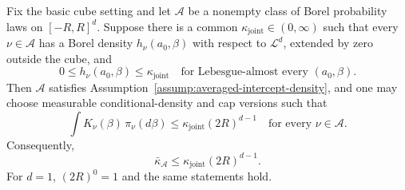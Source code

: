 \begin{lemma}
\label{lem:joint-density-bridge}
Fix the basic cube setting and let $\mathcal A$ be a nonempty class of
Borel probability laws on $[-R,R]^d$.  Suppose there is a common
$\kappa_{\mathrm{joint}}\in(0,\infty)$ such that every
$\nu\in\mathcal A$ has a Borel density $h_\nu(a_0,\beta)$ with respect
to $\mathcal L^d$, extended by zero outside the cube, and
\[
0\leq h_\nu(a_0,\beta)
\leq\kappa_{\mathrm{joint}}
\quad\text{for Lebesgue-almost every }(a_0,\beta).
\]
Then $\mathcal A$ satisfies
Assumption~\ref{assump:averaged-intercept-density}, and one may choose
measurable conditional-density and cap versions such that
\[
\int K_\nu(\beta)\,\pi_\nu(d\beta)
\leq\kappa_{\mathrm{joint}}(2R)^{d-1}
\quad\text{for every }\nu\in\mathcal A.
\]
Consequently,
\[
\bar\kappa_{\mathcal A}
\leq\kappa_{\mathrm{joint}}(2R)^{d-1}.
\]
For $d=1$, $(2R)^0=1$ and the same statements hold.
\end{lemma}

